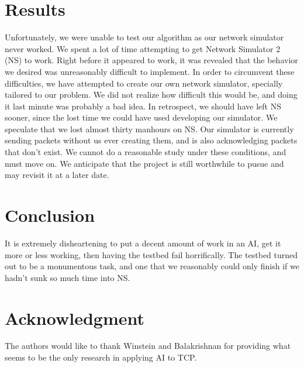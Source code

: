 \documentclass[conference]{IEEEtran}
\begin{document}

\section{Results}
Unfortunately, we were unable to test our algorithm as our network simulator never worked. We spent a lot of time attempting to get Network Simulator 2 (NS) to work. Right before it appeared to work, it was revealed that the behavior we desired was unreasonably difficult to implement. In order to circumvent these difficulties, we have attempted to create our own network simulator, specially tailored to our problem. We did not realize how difficult this would be, and doing it last minute was probably a bad idea. In retrospect, we should have left NS sooner, since the lost time we could have used developing our simulator. We speculate that we lost almost thirty manhours on NS. Our simulator is currently sending packets without us ever creating them, and is also acknowledging packets that don't exist. We cannot do a reasonable study under these conditions, and must move on. We anticipate that the project is still worthwhile to pusue and may revisit it at a later date.


\section{Conclusion}
It is extremely disheartening to put a decent amount of work in an AI, get it more or less working, then having the testbed fail horrifically. The testbed turned out to be a monumentous task, and one that we reasonably could only finish if we hadn't sunk so much time into NS. 






\section*{Acknowledgment}


The authors would like to thank Winstein and Balakrishnan for providing what seems to be the only research in applying AI to TCP.
\end{document}
